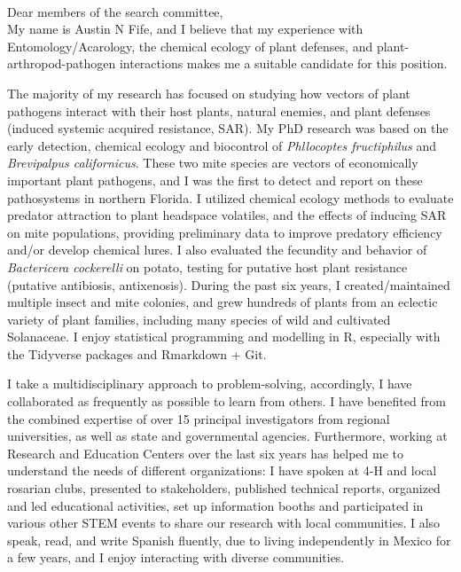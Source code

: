 \documentclass[11pt]{letter} %
\begin{document}
\begin{letter}
\\
Dear members of the search committee,\\

My name is Austin N Fife, and I believe that my experience with Entomology/Acarology, the chemical ecology of plant defenses, and plant-arthropod-pathogen interactions makes me a suitable candidate for this position.

The majority of my research has focused on studying how vectors of plant pathogens interact with their host plants, natural enemies, and plant defenses (induced systemic acquired resistance, SAR). My PhD research was based on the early detection, chemical ecology and biocontrol of \textit{Phllocoptes fructiphilus} and \textit{Brevipalpus californicus}. These two mite species are vectors of economically important plant pathogens, and I was the first to detect and report on these pathosystems in northern Florida. I utilized chemical ecology methods to evaluate predator attraction to plant headspace volatiles, and the effects of inducing SAR on mite populations, providing preliminary data to improve predatory efficiency and/or develop chemical lures. I also evaluated the fecundity and behavior of \textit{Bactericera cockerelli} on potato, testing for putative host plant resistance (putative antibiosis, antixenosis). During the past six years, I created/maintained multiple insect and mite colonies, and grew hundreds of plants from an eclectic variety of plant families, including many species of wild and cultivated Solanaceae. I enjoy statistical programming and modelling in R, especially with the Tidyverse packages and Rmarkdown + Git. 

I take a multidisciplinary approach to problem-solving, accordingly, I have collaborated as frequently as possible to learn from others. I have benefited from the combined expertise of over 15 principal investigators from regional universities, as well as state and governmental agencies. Furthermore, working at Research and Education Centers over the last six years has helped me to understand the needs of different organizations: I have spoken at 4-H and local rosarian clubs, presented to stakeholders, published technical reports, organized and led educational activities, set up information booths and participated in various other STEM events to share our research with local communities. I also speak, read, and write Spanish fluently, due to living independently in Mexico for a few years, and I enjoy interacting with diverse communities. 


\end{letter}
\end{document}
